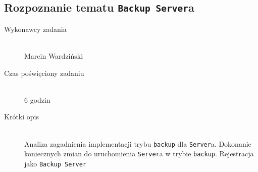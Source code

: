 \documentclass[a4paper]{article}
\begin{document}
\subsection{Rozpoznanie tematu \texttt{Backup Server}a}
\begin{description}
    \item[Wykonawcy zadania] \hfill \\ Marcin Wardziński
    \item[Czas poświęciony zadaniu] \hfill \\ 6 godzin
    \item[Krótki opis] \hfill \\ Analiza zagadnienia implementacji trybu \texttt{backup} dla \texttt{Server}a. Dokonanie koniecznych zmian do uruchomienia \texttt{Server}a w trybie \texttt{backup}. Rejestracja jako \texttt{Backup Server}
\end{description}   
\end{document}

